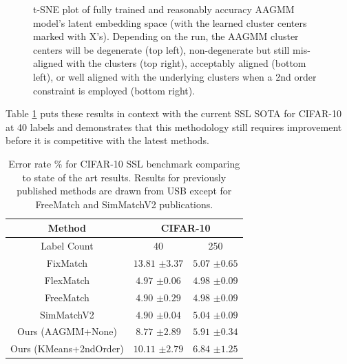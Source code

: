 \documentclass[10pt,twocolumn,letterpaper]{article}
\begin{document}
\begin{figure}[h]
	\caption{t-SNE plot of fully trained and reasonably accuracy AAGMM model's latent embedding space (with the learned cluster centers marked with X's). Depending on the run, the AAGMM cluster centers will be degenerate (top left), non-degenerate but still mis-aligned with the clusters (top right), acceptably aligned (bottom left), or well aligned with the underlying clusters when a 2nd order constraint is employed (bottom right).} 
	\label{fig:cifar10tsneaagmmnone}
\end{figure}


Table \ref{sslcifar10} puts these results in context with the current SSL SOTA for CIFAR-10 at 40 labels and demonstrates that this methodology still requires improvement before it is competitive with the latest methods. 

\begin{table}[htbp]
	\begin{tabular}{c|cc}
		Method          & \multicolumn{2}{c}{CIFAR-10} \\ \hline
		Label Count     & 40            & 250           \\
		\hline
		FixMatch\cite{sohn2020fixmatch}   & $13.81$ \scriptsize{$\pm3.37$}   & $5.07$ \scriptsize{$\pm0.65$}     \\
		FlexMatch\cite{zhang2021flexmatch}  & $4.97$ \scriptsize{$\pm0.06$}    & $4.98$ \scriptsize{$\pm0.09$}    \\
		FreeMatch\cite{wang2022freematch}  & $4.90$ \scriptsize{$\pm0.29$}    & $4.98$ \scriptsize{$\pm0.09$}    \\
		SimMatchV2\cite{zheng2023simmatchv2} & $4.90$ \scriptsize{$\pm0.04$}    & $5.04$ \scriptsize{$\pm0.09$}    \\ \hline
		Ours (AAGMM+None)    & $8.77$ \scriptsize{$\pm 2.89$}           & $5.91$ \scriptsize{$\pm 0.34$}  \\
		Ours (KMeans+2ndOrder)    & $10.11$ \scriptsize{$\pm 2.79$}           & $6.84$ \scriptsize{$\pm 1.25$}  
		
	\end{tabular}
	\caption{Error rate \% for CIFAR-10 SSL benchmark comparing to state of the art results. Results for previously published methods are drawn from USB \cite{wang2022usb} except for FreeMatch\cite{wang2022freematch} and SimMatchV2\cite{zheng2023simmatchv2} publications.}
	\label{sslcifar10}
\end{table}
\end{document}
